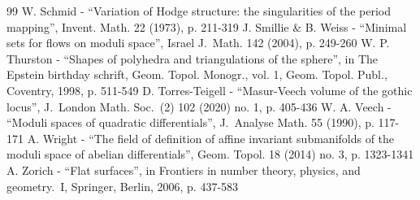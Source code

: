 \documentclass[10pt]{amsart}
\theoremstyle{plain}
\theoremstyle{definition}
\begin{document}
\begin{thebibliography}{99}
 W. Schmid - “Variation of Hodge structure: the singularities of the period mapping”, Invent. Math. 22 (1973), p. 211-319
 J. Smillie \& B. Weiss - “Minimal sets for flows on moduli space”, Israel J. Math. 142 (2004), p. 249-260
 W. P. Thurston - “Shapes of polyhedra and triangulations of the sphere”, in The Epstein birthday schrift, Geom. Topol. Monogr., vol. 1, Geom. Topol. Publ., Coventry, 1998, p. 511-549
 D. Torres-Teigell - “Masur-Veech volume of the gothic locus”, J. London Math. Soc. (2) 102 (2020) no. 1, p. 405-436
 W. A. Veech - “Moduli spaces of quadratic differentials”, J. Analyse Math. 55 (1990), p. 117-171
 A. Wright - “The field of definition of affine invariant submanifolds of the moduli space of abelian differentials”, Geom. Topol. 18 (2014) no. 3, p. 1323-1341
 A. Zorich - “Flat surfaces”, in Frontiers in number theory, physics, and geometry. I, Springer, Berlin, 2006, p. 437-583
\end{thebibliography}
\end{document}
